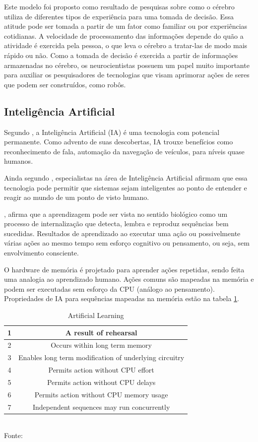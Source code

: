 Este modelo foi proposto como resultado de pesquisas sobre como o cérebro utiliza de diferentes tipos de experiência para uma tomada de decisão. Essa atitude pode ser tomada a partir de um fator como familiar ou por experiências cotidianas. A velocidade de processamento das informações depende do quão a atividade é exercida pela pessoa, o que leva o cérebro a tratar-las de modo mais rápido ou não. Como a tomada de decisão é exercida a partir de informações armazenadas no cérebro, os neurocientistas possuem um papel muito importante para auxiliar os pesquisadores de tecnologias que visam aprimorar ações de seres que podem ser construídos, como robôs.

\subsection{Inteligência Artificial}
\label{subsec:artificial}

Segundo \cite{anthes}, a Inteligência Artificial (IA) é uma tecnologia com potencial permanente. Como advento de suas descobertas, IA trouxe benefícios como reconhecimento de fala, automação da navegação de veículos, para níveis quase humanos.

Ainda segundo \cite{anthes}, especialistas na área de Inteligência Artificial afirmam que essa tecnologia pode permitir que sistemas sejam inteligentes ao ponto de entender e reagir ao mundo de um ponto de visto humano. 

\cite{john}, afirma que a aprendizagem pode ser vista no sentido biológico como um processo de internalização que detecta, lembra e reproduz sequências bem sucedidas. Resultados de aprendizado ao executar uma ação ou possivelmente várias ações ao mesmo tempo sem esforço cognitivo ou pensamento, ou seja, sem envolvimento consciente.

O hardware de memória é projetado para aprender ações repetidas, sendo feita uma analogia ao aprendizado humano. Ações comuns são mapeadas na memória e podem ser executadas sem esforço da CPU (análogo ao pensamento). Propriedades de IA para sequências mapeadas na memória estão na tabela \ref{tab:artificial}.

\begin{table}[H]
\centering
\caption{Artificial Learning}
\begin{tabular}{|c|c|}
\hline
1 & A result of rehearsal                    \\ \hline
2 & Occurs within long term memory \\ \hline
3 & Enables long term modification of underlying circuitry \\ \hline
4 & Permits action without CPU effort \\ \hline
5 & Permits action without CPU delays \\ \hline
6 & Permits action without CPU memory usage \\ \hline
7 & Independent sequences may run concurrently \\ \hline
\end{tabular}
\\ 
Fonte: \cite{john}
\label{tab:artificial}
\end{table}

